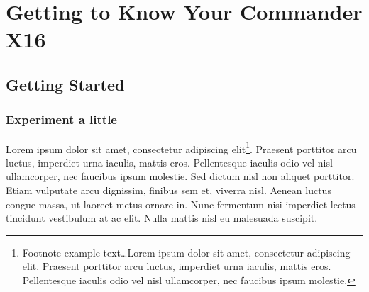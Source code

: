 
\makeatletter\@openrightfalse
\part{Getting to Know Your Commander X16}




\chapter{Getting Started}

\section{Experiment a little}

Lorem ipsum dolor sit amet, consectetur adipiscing elit\footnote{Footnote
example text\ldots Lorem ipsum dolor sit amet, consectetur adipiscing elit.
Praesent porttitor arcu luctus, imperdiet urna iaculis, mattis eros.
Pellentesque iaculis odio vel nisl ullamcorper, nec faucibus ipsum molestie.}.
Praesent porttitor arcu luctus, imperdiet urna iaculis, mattis eros.
Pellentesque iaculis odio vel nisl ullamcorper, nec faucibus ipsum molestie.
Sed dictum nisl non aliquet porttitor. Etiam vulputate arcu dignissim, finibus
sem et, viverra nisl. Aenean luctus congue massa, ut laoreet metus ornare in.
Nunc fermentum nisi imperdiet lectus tincidunt vestibulum at ac elit. Nulla
mattis nisl eu malesuada suscipit.


